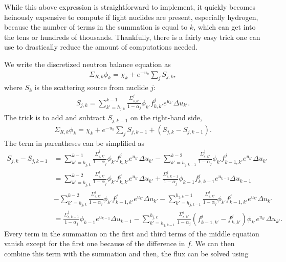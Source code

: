 While this above expression is straightforward to implement, it quickly becomes heinously expensive to compute if light nuclides are present, especially hydrogen, because the number of terms in the summation is equal to $k$, which can get into the tens or hundreds of thousands. Thankfully, there is a fairly easy trick one can use to drastically reduce the amount of computations needed. 

We write the discretized neutron balance equation as
\begin{align}
  \Sigma_{R,k} \phi_k = \chi_k + e^{-u_k} \sum_j S_{j,k},
\end{align}
where $S_k$ is the scattering source from nuclide $j$:
\begin{align}
  S_{j,k} = \sum_{k'=h_{j,k}}^{k-1} \frac{ \Sigma_{s,k'}^j }{ 1 - \alpha_j } \phi_{k'}  f_{k,k'}^j e^{u_{k'}} \Delta u_{k'} .
\end{align}
The trick is to add and subtract $S_{j,k-1}$ on the right-hand side,
\begin{align}
  \Sigma_{R,k} \phi_k = \chi_k + e^{-u_k} \sum_j S_{j,k-1} + \left( S_{j,k} - S_{j,k-1} \right) .
\end{align}
The term in parentheses can be simplified as
\begin{align}
  S_{j,k} - S_{j,k-1}
  &= \sum_{k'=h_{j,k}}^{k-1} \frac{ \Sigma_{s,k'}^j }{ 1 - \alpha_j } \phi_{k'} f_{k,k'}^j e^{u_{k'}} \Delta u_{k'} - \sum_{k'=h_{j,k-1}}^{k-2} \frac{ \Sigma_{s,k'}^j }{ 1 - \alpha_j } \phi_{k'} f_{k-1,k'}^j e^{u_{k'}} \Delta u_{k'} \nonumber \\
  &= \sum_{k'=h_{j,k}}^{k-2} \frac{ \Sigma_{s,k'}^j }{ 1 - \alpha_j } \phi_{k'} f_{k,k'}^j e^{u_{k'}} \Delta u_{k'} + \frac{ \Sigma_{s,k-1}^j }{ 1 - \alpha_j } \phi_{k-1} f_{k,k-1}^j e^{u_{k-1}} \Delta u_{k-1} \nonumber \\
  &- \sum_{k'=h_{j,k}}^{k-2} \frac{ \Sigma_{s,k'}^j }{ 1 - \alpha_j } \phi_{k'} f_{k-1,k'}^j e^{u_{k'}} \Delta u_{k'} - \sum_{k'=h_{j,k-1}}^{h_{j,k}-1} \frac{ \Sigma_{s,k'}^j }{ 1 - \alpha_j } \phi_{k'} f_{k-1,k'}^j e^{u_{k'}} \Delta u_{k'} \nonumber \\
  &= \frac{ \Sigma_{s,k-1}^j }{ 1 - \alpha_j } \phi_{k-1} e^{u_{k-1}} \Delta u_{k-1} - \sum_{k'=h_{j,k-1}}^{h_{j,k}} \frac{ \Sigma_{s,k'}^j }{ 1 - \alpha_j } ( f_{k-1,k'}^j - f_{k,k'}^j ) \phi_{k'} e^{u_{k'}} \Delta u_{k'} . \label{Eq:libraryGeneration_ultrafine_scatterSourceDifference}
\end{align}
Every term in the summation on the first and third terms of the middle equation vanish except for the first one because of the difference in $f$. We can then combine this term with the summation and then, the flux can be solved using
